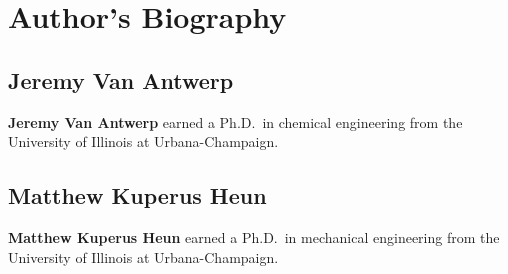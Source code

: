 

\chapter*{Author's Biography}


\section*{Jeremy Van Antwerp}

\textbf{Jeremy Van Antwerp} earned a Ph.D.\ in chemical engineering from 
the University of Illinois at Urbana-Champaign.


\section*{Matthew Kuperus Heun}

\textbf{Matthew Kuperus Heun} earned a Ph.D.\ in mechanical engineering from 
the University of Illinois at Urbana-Champaign.